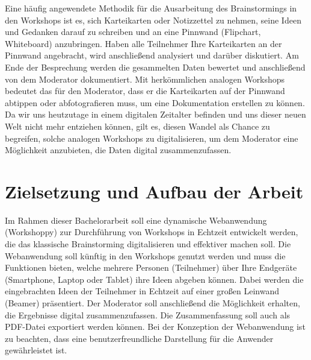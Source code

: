 Eine häufig angewendete Methodik für die Ausarbeitung des Brainstormings in den Workshops ist es, sich Karteikarten oder Notizzettel zu nehmen, seine Ideen und Gedanken darauf zu schreiben und an eine Pinnwand (Flipchart, Whiteboard) anzubringen. Haben alle Teilnehmer Ihre Karteikarten an der Pinnwand angebracht, wird anschließend analysiert und darüber diskutiert. Am Ende der Besprechung werden die gesammelten Daten bewertet und anschließend von dem Moderator dokumentiert. Mit herkömmlichen analogen Workshops bedeutet das für den Moderator, dass er die Karteikarten auf der Pinnwand abtippen oder abfotografieren muss, um eine Dokumentation erstellen zu können. Da wir uns heutzutage in einem digitalen Zeitalter befinden und uns dieser neuen Welt nicht mehr entziehen können, gilt es, diesen Wandel als Chance zu begreifen, solche analogen Workshops zu digitalisieren, um dem Moderator eine Möglichkeit anzubieten, die Daten digital zusammenzufassen.

\newpage
\section{Zielsetzung und Aufbau der Arbeit}
\label{subsec:zielsetzung}
Im Rahmen dieser Bachelorarbeit soll eine dynamische Webanwendung (Workshoppy) zur Durchführung von Workshops in Echtzeit entwickelt werden, die das klassische Brainstorming digitalisieren und effektiver machen soll. Die Webanwendung soll künftig in den Workshops genutzt werden und muss die Funktionen bieten, welche mehrere Personen (Teilnehmer) über Ihre Endgeräte (Smartphone, Laptop oder Tablet) ihre Ideen abgeben können. Dabei werden die eingebrachten Ideen der Teilnehmer in Echtzeit auf einer großen Leinwand (Beamer) präsentiert. Der Moderator soll anschließend die Möglichkeit erhalten, die Ergebnisse digital zusammenzufassen. Die Zusammenfassung soll auch als PDF-Datei exportiert werden können. Bei der Konzeption der Webanwendung ist zu beachten, dass eine benutzerfreundliche Darstellung für die Anwender gewährleistet ist.
\\

